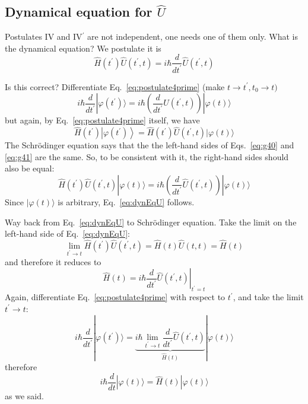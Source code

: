 \documentclass[12pt]{article}
\begin{document}
\subsection{\texorpdfstring{Dynamical equation for $\hat{U}$}{Dynamical equation for U}}

Postulates IV and IV$^\prime$ are not independent, one needs
one of them only. What is the dynamical equation?
We postulate it is
\begin{equation}
\boxed{
\hat{H}\left(t^{\prime}\right) \hat{U}\left(t^{\prime}, t\right)=i \hbar \frac{d}{d t^{\prime}} \hat{U}\left(t^{\prime}, t\right)
}
\label{eq:dynEqU}
\end{equation}

Is this correct? Differentiate Eq.~\eqref{eq:postulate4prime} (make $t \to t^\prime, t_0\to t)$
\begin{equation}
i \hbar \frac{d}{d t^\prime}|\varphi(t^\prime)\rangle =
i \hbar\left(\frac{d}{d t^\prime} \hat{U}\left(t^{\prime},t\right) \right) |\varphi(t)\rangle	
\label{eq:g40}
\end{equation}
but again, by Eq.~\eqref{eq:postulate4prime} itself, we have
\begin{equation}
\hat{H}\left(t^{\prime}\right)\left|\varphi\left(t^{\prime}\right)\right\rangle=
\hat{H}(t^\prime) \hat{U}\left(t^{\prime}, t\right)|\varphi(t)\rangle
\label{eq:g41}
\end{equation}
The Schrödinger equation says that the the left-hand sides of Eqs.~\eqref{eq:g40} and \eqref{eq:g41} are the same.
So, to be consistent with it, the right-hand sides should also be equal:
\[
\hat{H}(t^\prime) \hat{U}\left(t^{\prime}, t\right)|\varphi(t)\rangle = 
i \hbar\left(\frac{d}{d t^\prime} \hat{U}\left(t^{\prime},t\right) \right) |\varphi(t)\rangle
\]
Since $|\varphi(t)\rangle$ is arbitrary, Eq.~\eqref{eq:dynEqU} follows.


Way back from Eq.~\eqref{eq:dynEqU} to Schrödinger equation. Take the limit on the left-hand side of Eq.~\eqref{eq:dynEqU}:
\[
\lim _{t^{\prime} \rightarrow t} 
\hat{H} (t^{\prime}) \hat{U}(t^{\prime}, t)=\hat{H}(t) \hat{U}(t, t)=\hat{H}(t)
\]
and therefore it reduces to
\begin{equation}
\hat{H}(t)=\left.i \hbar \frac{d}{d t^{\prime}} \hat{U}\left(t^{\prime}, t\right)\right|_{t^{\prime}=t}
\label{eq:g42}
\end{equation}
Again, differentiate Eq.~\eqref{eq:postulate4prime} with respect to $t^\prime$, and take the limit $t^\prime \to t$:
\begin{equation}
i \hbar \frac{d}{d t^\prime}|\varphi(t^\prime)\rangle = 
\underbrace{i \hbar \lim _{t^{\prime} \rightarrow t} \frac{d}{d t^{\prime}} \hat{U}\left(t^{\prime}, t\right)}%
_{\hat{H}(t)}%
|\varphi(t)\rangle
\end{equation}
therefore
\[
i \hbar \frac{d}{d t}|\varphi(t)\rangle=\hat{H}(t)|\varphi(t)\rangle
\]
as we said.
\end{document}
